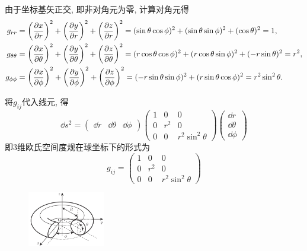 \begin{solution}
    \vspace*{1em}
    由于坐标基矢正交, 即非对角元为零, 计算对角元得
    \begin{align*}
        g_{rr} &= \left(\frac{\partial x}{\partial r}\right)^2 + \left(\frac{\partial y}{\partial r}\right)^2 + \left(\frac{\partial z}{\partial r}\right)^2 = (\sin \theta \cos \phi)^2 + (\sin \theta \sin \phi)^2 + (\cos \theta)^2 = 1, \\
        g_{\theta\theta} &= \left(\frac{\partial x}{\partial \theta}\right)^2 + \left(\frac{\partial y}{\partial \theta}\right)^2 + \left(\frac{\partial z}{\partial \theta}\right)^2 = (r \cos \theta \cos \phi)^2 + (r \cos \theta \sin \phi)^2 + (-r \sin \theta)^2 = r^2, \\
        g_{\phi\phi} &= \left(\frac{\partial x}{\partial \phi}\right)^2 + \left(\frac{\partial y}{\partial \phi}\right)^2 + \left(\frac{\partial z}{\partial \phi}\right)^2 = (-r \sin \theta \sin \phi)^2 + (r \sin \theta \cos \phi)^2 = r^2 \sin^2\theta.
    \end{align*}

    将$g_{ij}$代入线元, 得
    \[
        \dd s^2 = \begin{pmatrix}
            \dd r & \dd \theta & \dd \phi
        \end{pmatrix} \begin{pmatrix}
            1 & 0 & 0 \\
            0 & r^2 & 0 \\
            0 & 0 & r^2 \sin^2\theta
        \end{pmatrix} \begin{pmatrix}
            \dd r \\ \dd \theta \\ \dd \phi
        \end{pmatrix}
    \]
    即$3$维欧氏空间度规在球坐标下的形式为
    \[
        g_{ij} = \begin{pmatrix}
            1 & 0 & 0 \\
            0 & r^2 & 0 \\
            0 & 0 & r^2 \sin^2\theta
        \end{pmatrix}
    \]
\end{solution}


\begin{figure}[h]
    \centering
    \includegraphics[width=0.3\textwidth]{content/Figures/3-3}
    \caption{ }
    \label{fig:3-3}
\end{figure}

